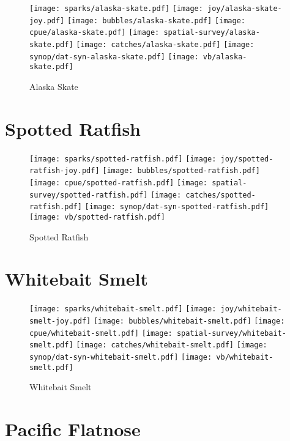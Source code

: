 \begin{figure}[htbp]
\centering
\texttt{[image: sparks/alaska-skate.pdf]}
\texttt{[image: joy/alaska-skate-joy.pdf]}
\texttt{[image: bubbles/alaska-skate.pdf]}
\texttt{[image: cpue/alaska-skate.pdf]}
\texttt{[image: spatial-survey/alaska-skate.pdf]}
\texttt{[image: catches/alaska-skate.pdf]}
\texttt{[image: synop/dat-syn-alaska-skate.pdf]}
\texttt{[image: vb/alaska-skate.pdf]}
\caption{Alaska Skate}
\end{figure}
\clearpage
\section{Spotted Ratfish}

\begin{figure}[htbp]
\centering
\texttt{[image: sparks/spotted-ratfish.pdf]}
\texttt{[image: joy/spotted-ratfish-joy.pdf]}
\texttt{[image: bubbles/spotted-ratfish.pdf]}
\texttt{[image: cpue/spotted-ratfish.pdf]}
\texttt{[image: spatial-survey/spotted-ratfish.pdf]}
\texttt{[image: catches/spotted-ratfish.pdf]}
\texttt{[image: synop/dat-syn-spotted-ratfish.pdf]}
\texttt{[image: vb/spotted-ratfish.pdf]}
\caption{Spotted Ratfish}
\end{figure}
\clearpage
\section{Whitebait Smelt}

\begin{figure}[htbp]
\centering
\texttt{[image: sparks/whitebait-smelt.pdf]}
\texttt{[image: joy/whitebait-smelt-joy.pdf]}
\texttt{[image: bubbles/whitebait-smelt.pdf]}
\texttt{[image: cpue/whitebait-smelt.pdf]}
\texttt{[image: spatial-survey/whitebait-smelt.pdf]}
\texttt{[image: catches/whitebait-smelt.pdf]}
\texttt{[image: synop/dat-syn-whitebait-smelt.pdf]}
\texttt{[image: vb/whitebait-smelt.pdf]}
\caption{Whitebait Smelt}
\end{figure}
\clearpage
\section{Pacific Flatnose}

